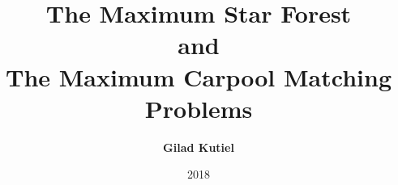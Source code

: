 \title{
The Maximum Star Forest 
\\
and 
\\
The Maximum Carpool Matching
\\
Problems 
}
\author[shortname]{
    \textbf{Gilad Kutiel}
}
\date{2018}

